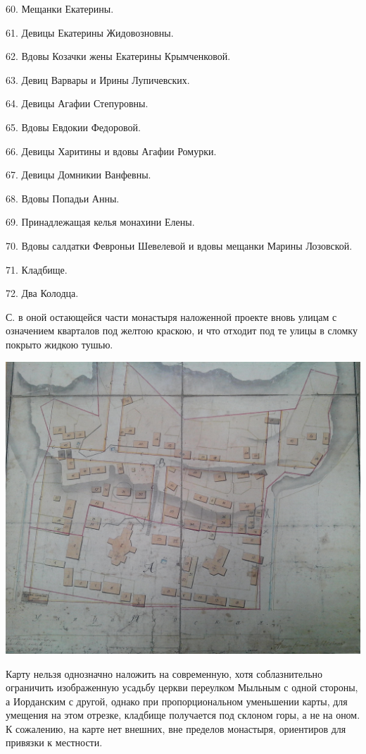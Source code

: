 60. Мещанки Екатерины.

61. Девицы Екатерины Жидовозновны.

62. Вдовы Козачки жены Екатерины Крымченковой.

63. Девиц Варвары и Ирины Лупичевских.

64. Девицы Агафии Степуровны.

65. Вдовы Евдокии Федоровой.

66. Девицы Харитины и вдовы Агафии Ромурки.

67. Девицы Домникии Ванфевны.

68. Вдовы Попадьи Анны.

69. Принадлежащая келья монахини Елены.

70. Вдовы салдатки Февроньи Шевелевой и вдовы мещанки Марины Лозовской.

71. Кладбище.

72. Два Колодца.

С. в оной остающейся части монастыря наложенной проекте вновь улицам с означением кварталов под желтою краскою, и что отходит под те улицы в сломку покрыто жидкою тушью.

\begin{center}
\includegraphics[width=\linewidth]{chast-kirvys/iordanruch/IMG_20170627_142118.jpg}
\end{center}

Карту нельзя однозначно наложить на современную, хотя соблазнительно ограничить изображенную усадьбу церкви переулком Мыльным с одной стороны, а Иорданским с другой, однако при пропорциональном уменьшении карты, для умещения на этом отрезке, кладбище получается под склоном горы, а не на оном. К сожалению, на карте нет внешних, вне пределов монастыря, ориентиров для привязки к местности.

